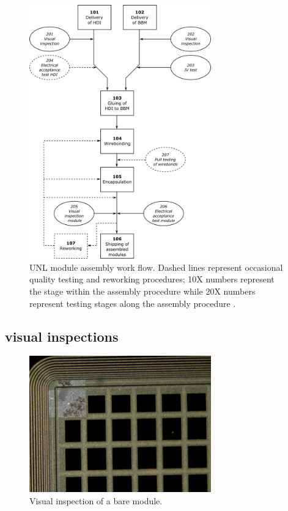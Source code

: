 \begin{figure}[!h]
  \centering
  \includegraphics[width=0.7\textwidth]{../images/ch7/unl_workflow}
  \caption[UNL module assembly work flow.]{UNL module assembly work flow. Dashed lines represent occasional quality testing and reworking procedures; 10X numbers represent the stage within the assembly procedure while 20X numbers represent testing stages along the assembly procedure \cite{ph1_sop}.}\label{fig:unlworkflow}
\end{figure}


\subsection{visual inspections}



\begin{figure}[!h]
  \centering
  \includegraphics[width=0.7\textwidth]{../images/ch7/vis_insp}
  \caption[Visual inspection of a bare module.]{Visual inspection of a bare module.}\label{fig:vis_insp}
\end{figure}


